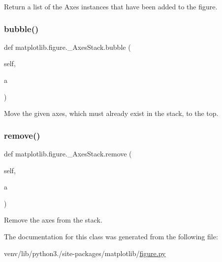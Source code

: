 \begin{DoxyVerb}Return a list of the Axes instances that have been added to the figure.
\end{DoxyVerb}
 \mbox{\label{classmatplotlib_1_1figure_1_1__AxesStack_a8fda07b52c3972eeb74a9debb6b3970d}} 
\subsubsection{\texorpdfstring{bubble()}{bubble()}}
{\footnotesize\ttfamily def matplotlib.\+figure.\+\_\+\+Axes\+Stack.\+bubble (\begin{DoxyParamCaption}\item[{}]{self,  }\item[{}]{a }\end{DoxyParamCaption})}

\begin{DoxyVerb}Move the given axes, which must already exist in the stack, to the top.
\end{DoxyVerb}
 \mbox{\label{classmatplotlib_1_1figure_1_1__AxesStack_a0ac61e4385f21e846d645cd61b9be273}} 
\subsubsection{\texorpdfstring{remove()}{remove()}}
{\footnotesize\ttfamily def matplotlib.\+figure.\+\_\+\+Axes\+Stack.\+remove (\begin{DoxyParamCaption}\item[{}]{self,  }\item[{}]{a }\end{DoxyParamCaption})}

\begin{DoxyVerb}Remove the axes from the stack.\end{DoxyVerb}
 

The documentation for this class was generated from the following file\+:\begin{DoxyCompactItemize}
\item 
venv/lib/python3./site-\/packages/matplotlib/\hyperlink{figure_8py}{figure.\+py}\end{DoxyCompactItemize}
